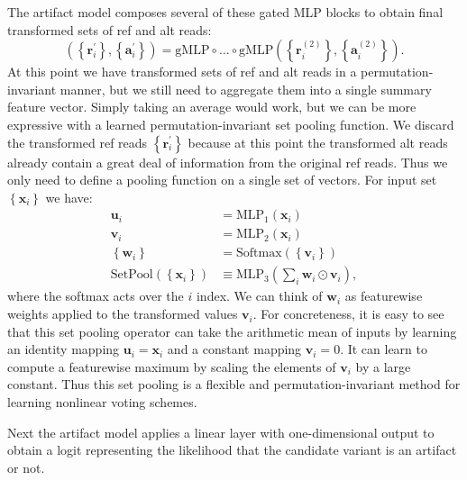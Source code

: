 \documentclass[times, twoside, watermark]{StyleBioRxiv}
\begin{document}
The artifact model composes several of these gated MLP blocks to obtain final transformed sets of ref and alt reads:
\begin{equation}
    \left( \left\{ \mathbf{r}_i^\prime  \right\}, \left\{ \mathbf{a}_i^\prime  \right\} \right) = \mathrm{gMLP} \circ \dots \circ \mathrm{gMLP} \left( \left\{ \mathbf{r}_i^{(2)}  \right\}, \left\{ \mathbf{a}_i^{(2)} \right\} \right).
\end{equation}
At this point we have transformed sets of ref and alt reads in a permutation-invariant manner, but we still need to aggregate them into a single summary feature vector.  Simply taking an average would work, but we can be more expressive with a learned permutation-invariant set pooling function.  We discard the transformed ref reads $\left\{ \mathbf{r}_i^\prime  \right\}$ because at this point the transformed alt reads already contain a great deal of information from the original ref reads.  Thus we only need to define a pooling function on a single set of vectors.  For input set $\left\{ \mathbf{x}_i  \right\}$ we have:
\begin{align}
    \mathbf{u}_i &= \mathrm{MLP}_1(\mathbf{x}_i) \\
    \mathbf{v}_i &= \mathrm{MLP}_2(\mathbf{x}_i) \\
    \left\{ \mathbf{w}_i \right\} &= \mathrm{Softmax} \left( \left\{ \mathbf{v}_i \right\} \right) \\
    \mathrm{SetPool}\left( \left\{ \mathbf{x}_i \right\} \right) &\equiv \mathrm{MLP}_3 \left( \sum_i \mathbf{w}_i \odot \mathbf{v}_i \right),
\end{align}
where the softmax acts over the $i$ index.  We can think of $\mathbf{w}_i$ as featurewise weights applied to the transformed values $\mathbf{v}_i$.  For concreteness, it is easy to see that this set pooling operator can take the arithmetic mean of inputs by learning an identity mapping $\mathbf{u}_i = \mathbf{x}_i$ and a constant mapping $\mathbf{v}_i = 0$.  It can learn to compute a featurewise maximum by scaling the elements of $\mathbf{v}_i$ by a large constant.  Thus this set pooling is a flexible and permutation-invariant method for learning nonlinear voting schemes.

Next the artifact model applies a linear layer with one-dimensional output to obtain a logit representing the likelihood that the candidate variant is an artifact or not.
\end{document}
